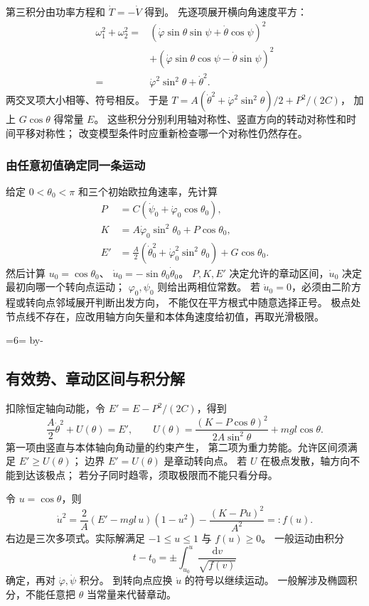 \documentclass[UTF8,zihao=-4,fontset=fandol,a4paper]{ctexart}
\makeatletter
\newcommand{\dd}{\mathrm d}
\newcommand{\Needspace}[1]{\par\if@nobreak\else\penalty0\begingroup\dimen0=#1\relax\dimen2=\pagegoal\advance\dimen2 by-\pagetotal\ifdim\dimen0>\dimen2\newpage\fi\endgroup\fi}
\let\SavedSubsection\subsection
\renewcommand{\subsection}{\Needspace{6\baselineskip}\SavedSubsection}
\makeatother
\begin{document}
第三积分由功率方程和 $\dot T=-\dot V$ 得到。
先逐项展开横向角速度平方：
\[
\begin{aligned}
\omega_1^2+\omega_2^2
={}&(\dot\varphi\sin\theta\sin\psi+\dot\theta\cos\psi)^2\\
&+(\dot\varphi\sin\theta\cos\psi-\dot\theta\sin\psi)^2\\
={}&\dot\varphi^2\sin^2\theta+\dot\theta^2.
\end{aligned}
\]
两交叉项大小相等、符号相反。
于是 $T=A(\dot\theta^2+\dot\varphi^2\sin^2\theta)/2+P^2/(2C)$，
加上 $G\cos\theta$ 得常量 $E$。
这些积分分别利用轴对称性、竖直方向的转动对称性和时间平移对称性；
改变模型条件时应重新检查哪一个对称性仍然存在。

\subsubsection*{由任意初值确定同一条运动}
给定 $0<\theta_0<\pi$ 和三个初始欧拉角速率，先计算
\[
\begin{aligned}
P&=C(\dot\psi_0+\dot\varphi_0\cos\theta_0),\\
K&=A\dot\varphi_0\sin^2\theta_0+P\cos\theta_0,\\
E'&=\frac A2(\dot\theta_0^2+\dot\varphi_0^2\sin^2\theta_0)
+G\cos\theta_0.
\end{aligned}
\]
然后计算 $u_0=\cos\theta_0$、
$\dot u_0=-\sin\theta_0\dot\theta_0$。
$P,K,E'$ 决定允许的章动区间，$\dot u_0$ 决定最初向哪一个转向点运动；
$\varphi_0,\psi_0$ 则给出两相位常数。
若 $\dot u_0=0$，必须由二阶方程或转向点邻域展开判断出发方向，
不能仅在平方根式中随意选择正号。
极点处节点线不存在，应改用轴方向矢量和本体角速度给初值，再取光滑极限。


\subsection{有效势、章动区间与积分解}\label{sub:c3-9.3}
扣除恒定轴向动能，令 $E'=E-P^2/(2C)$，得到
\begin{equation}\label{eq:heavypotential}
\frac A2\dot\theta^2+U(\theta)=E',\qquad
U(\theta)=\frac{(K-P\cos\theta)^2}{2A\sin^2\theta}+mgl\cos\theta.
\end{equation}
第一项由竖直与本体轴向角动量的约束产生，
第二项为重力势能。允许区间须满足 $E'\ge U(\theta)$；
边界 $E'=U(\theta)$ 是章动转向点。
若 $U$ 在极点发散，轴方向不能到达该极点；
若分子同时趋零，须取极限而不能只看分母。

令 $u=\cos\theta$，则
\[
\dot u^2=\frac2A(E'-mgl\,u)(1-u^2)-\frac{(K-Pu)^2}{A^2}
=:f(u).
\]
右边是三次多项式。实际解满足 $-1\le u\le1$ 与 $f(u)\ge0$。
一般运动由积分
\[
t-t_0=\pm\int_{u_0}^u\frac{\dd v}{\sqrt{f(v)}}
\]
确定，再对 $\dot\varphi,\dot\psi$ 积分。
到转向点应换 $\dot u$ 的符号以继续运动。
一般解涉及椭圆积分，不能任意把 $\theta$ 当常量来代替章动。
\end{document}
